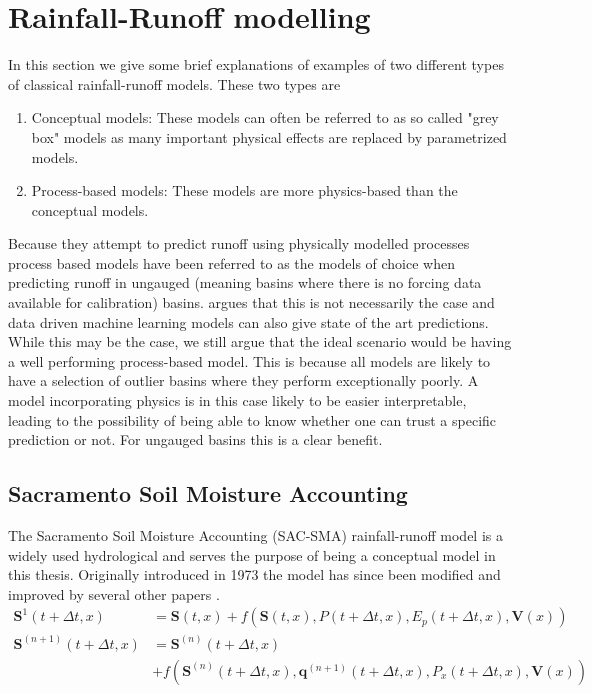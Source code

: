 \section{Rainfall-Runoff modelling}
In this section we give some brief explanations of examples of two different types 
of classical rainfall-runoff models. These two types are
\begin{enumerate}
    \item Conceptual models: These models can often be referred to as so called "grey box" models \citationneeded as many important physical effects are replaced by parametrized models.
    \item Process-based models: These models are more physics-based than the conceptual models. 
\end{enumerate}
Because they attempt to predict runoff using physically modelled processes process based models
have been referred to as the models of choice when predicting runoff in ungauged 
 (meaning basins where there is no forcing data available for calibration) basins. 
 \cite{lstm_third_paper} argues that this is not necessarily the case and data driven 
 machine learning models can also give state of the art predictions.
 While this may be the case, we still argue that the ideal scenario would be having 
 a well performing process-based model. This is because all models are likely to 
 have a selection of outlier basins where they perform exceptionally poorly. A model 
 incorporating physics is in this case likely to be easier interpretable, leading 
 to the possibility of being able to know whether one can trust a specific prediction or not. 
 For ungauged basins this is a clear benefit.
\subsection{Sacramento Soil Moisture Accounting}
The Sacramento Soil Moisture Accounting (SAC-SMA) \cite{SAC-SMA} rainfall-runoff model is a widely 
used hydrological and serves the purpose of being a conceptual model in this thesis.
Originally introduced in 1973 the model has since been modified and improved by 
several other papers \cite{SAC-SMA-physics}.
\begin{align}
    \bm{S}^1(t + \Delta t,x) &= \bm{S}(t,x) + f\left(\bm{S}(t,x),P(t+\Delta t,x),E_p (t+\Delta t, x), \bm{V}(x) \right) \\
    \bm{S}^{(n+1)}(t+\Delta t,x) &= \bm{S}^{(n)}(t+\Delta t, x) \nonumber \\
    &+ f\left( \bm{S}^{(n)}(t+\Delta t, x), \bm{q}^{(n+1)}(t+\Delta t,x),P_x(t+\Delta t,x),\bm{V}(x)  \right)
\end{align}

